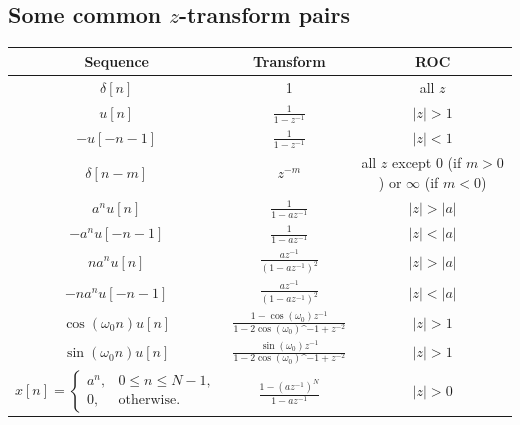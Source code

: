 \subsection{Some common $z$-transform pairs}
\begin{table}[H]
    \centering
    \begin{tabular}{c c c}
    \toprule
    \textbf{Sequence}    & \textbf{Transform}     & \textbf{ROC} \\ 
    \midrule
        $\delta[n]$     &   1   & all $z$  \\[.5em]
        
        $u[n]$     &   $\frac{1}{1-z^{-1}}$   & $\lvert z \rvert >1$  \\[.5em]
        
        $-u[-n-1]$     &   $\frac{1}{1-z^{-1}}$   &  $\lvert z \rvert <1$  \\[.5em]
        
        $\delta[n-m]$     &   $z^{-m}$   & all $z$ except 0 (if $m>0$) or $\infty$ (if $m<0$) \\[.5em]
        
        $a^{n}u[n]$     &  $\frac{1}{1-az^{-1}}$    & $\lvert z \rvert > \lvert a \rvert$\\[.5em]
        
        $-a^{n}u[-n-1]$     &  $\frac{1}{1-az^{-1}}$    & $\lvert z \rvert < \lvert a \rvert$\\[.5em]
        
        $na^{n}u[n]$     &  $\frac{az^{-1}}{(1-az^{-1})^2}$    & $\lvert z \rvert > \lvert a \rvert$\\[.5em]
        
        $-na^{n}u[-n-1]$     &  $\frac{az^{-1}}{(1-az^{-1})^2}$    & $\lvert z \rvert < \lvert a \rvert$\\[.5em]
        
        $\cos(\omega_0 n)u[n]$     &  $\frac{1-\cos(\omega_0)z^{-1}}{1-2\cos(\omega_0)\^{-1}+z^{-2}}$    & $\lvert z \rvert > 1$\\[.5em]

        $\sin(\omega_0 n)u[n]$     &  $\frac{\sin(\omega_0)z^{-1}}{1-2\cos(\omega_0)\^{-1}+z^{-2}}$    & $\lvert z \rvert > 1$\\[.5em]

        $x[n] = 
    \begin{cases}
        a^n,    & 0 \leq n \leq N-1, \\
        0,      & \text{otherwise}.
    \end{cases}$    & $\frac{1-(az^{-1})^N}{1-az^{-1}}$     & $\lvert z \rvert > 0$ \\

    \bottomrule
    \end{tabular}
\end{table}

